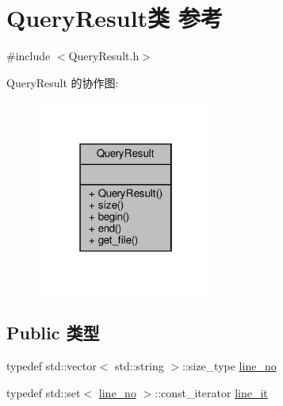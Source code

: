 \hypertarget{classQueryResult}{}\section{Query\+Result类 参考}
\label{classQueryResult}


{\ttfamily \#include $<$Query\+Result.\+h$>$}



Query\+Result 的协作图\+:\nopagebreak
\begin{figure}[H]
\begin{center}
\leavevmode
\includegraphics[width=166pt]{classQueryResult__coll__graph}
\end{center}
\end{figure}
\subsection*{Public 类型}
\begin{DoxyCompactItemize}
\item 
typedef std\+::vector$<$ std\+::string $>$\+::size\+\_\+type \hyperlink{classQueryResult_a34e6c64fb173f43499443469009c262f}{line\+\_\+no}
\item 
typedef std\+::set$<$ \hyperlink{classQueryResult_a34e6c64fb173f43499443469009c262f}{line\+\_\+no} $>$\+::const\+\_\+iterator \hyperlink{classQueryResult_a863424dfa74a1048fdcb636a98aea670}{line\+\_\+it}
\end{DoxyCompactItemize}
